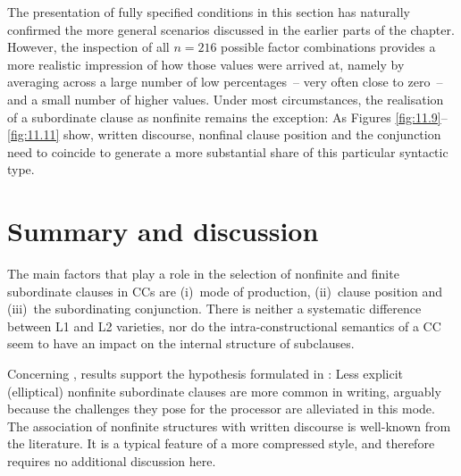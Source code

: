 The presentation of fully specified conditions in this section has naturally confirmed the more general scenarios discussed in the earlier parts of the chapter. However, the inspection of all $n=216$ possible factor combinations provides a more realistic impression of how those values were arrived at, namely by averaging across a large number of low percentages~– very often close to zero~– and a small number of higher values. Under most circumstances, the realisation of a subordinate clause as nonfinite remains the exception: As Figures \ref{fig:11.9}–\ref{fig:11.11} show, written discourse, nonfinal clause position and the conjunction  need to coincide to generate a more substantial share of this particular syntactic type.

\section{\label{bkm:Ref118502315}Summary and discussion}\label{sec:11.3}

The main factors that play a role in the selection of nonfinite and finite subordinate clauses in CCs are
(i)~mode of production,
(ii)~clause position and
(iii)~the subordinating conjunction. There is neither a systematic difference between L1 and L2 varieties, nor do the intra-constructional semantics of a CC seem to have an impact on the internal structure of subclauses.

Concerning , results support the hypothesis formulated in : Less explicit (elliptical) nonfinite subordinate clauses are more common in writing, arguably because the challenges they pose for the processor are alleviated in this mode. The association of nonfinite structures with written discourse is well-known from the literature. It is a typical feature of a more compressed style, and therefore requires no additional discussion here.

